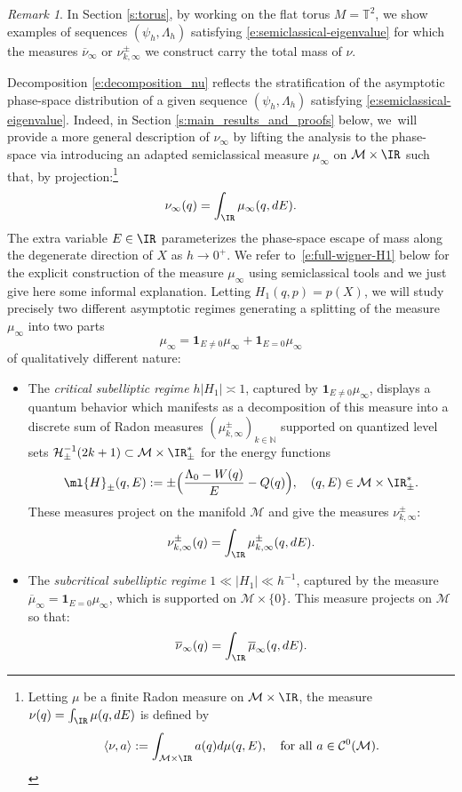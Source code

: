 \documentclass[JEP,XML,SOM,Unicode, NoEqCountersInSection,published]{cedram}
\theoremstyle{plain}
\theoremstyle{definition}
\theoremstyle{remark}
\newtheorem{rema}[theo]{Remark}
\begin{document}
\begin{rema}
In Section \ref{s:torus}, by working on the flat torus $M = \mathbb{T}^2$, we show examples of sequences $(\psi_h,\Lambda_h)$ satisfying \eqref{e:semiclassical-eigenvalue} for which the measures $\overline{\nu}_\infty$ or $\nu_{k,\infty}^\pm$ we construct carry the total mass of $\nu$.
\end{rema}

Decomposition \eqref{e:decomposition_nu} reflects the stratification of the asymptotic phase-space distribution of a given sequence $(\psi_h,\Lambda_h)$ satisfying \eqref{e:semiclassical-eigenvalue}. Indeed, in Section \ref{s:main_results_and_proofs} below, we~will provide a more general description of $\nu_\infty$ by lifting the analysis to the phase-space via introducing an adapted semiclassical measure $\mu_\infty$ on $\mathcal{M} \times \IR$ such that, by projection:\footnote{Letting $\mu$ be a finite Radon measure on $\mathcal{M} \times \IR$, the measure $\nu(q) = \int_\IR \mu(q,dE)$ is defined by
\[
\langle \nu , a \rangle := \int_{\mathcal{M} \times \IR} a(q) d\mu(q,E),\quad\text{for all $a \in \mathcal{C}^0(\mathcal{M})$.}
\]}
\[
\nu_\infty(q) = \int_\IR \mu_\infty(q,dE).
\]
The extra variable $E \in \IR$ parameterizes the phase-space escape of mass along the degenerate direction of $X$ as $h \to 0^+$. We refer to~\eqref{e:full-wigner-H1} below for the explicit construction of the measure $\mu_\infty$ using semiclassical tools and we just give here some informal explanation. Letting $H_1(q,p) = p(X)$, we will study precisely two different asymptotic regimes generating a splitting of the measure $\mu_\infty $ into two parts
\[
\mu_\infty = \mathbf{1}_{E \neq 0} \mu_\infty + \mathbf{1}_{E = 0} \mu_\infty
\]
of qualitatively different nature:
\begin{itemize}
\item The \emph{critical subelliptic regime} $h\vert H_1 \vert \asymp 1$, captured by $\mathbf{1}_{E \neq 0} \mu_\infty$, displays a quantum behavior which manifests as a decomposition of this measure into a discrete sum of Radon measures $(\mu^\pm_{k,\infty})_{k\in \mathbb{N}}$ supported on quantized level sets $\mathcal{H}_\pm^{-1}(2k+1) \subset \mathcal{M} \times \IR^*_\pm$ for the energy functions
\begin{equation}\label{e:preserved-quantity}
\ml{H}_\pm(q,E) := \pm \Bigl(\frac{\Lambda_0-W(q)}{E} - Q(q) \Bigr), \quad (q,E) \in \mathcal{M} \times \IR^*_\pm.
\end{equation}
These measures project on the manifold $\mathcal{M}$ and give the measures $\nu^\pm_{k,\infty}$:
\[
\nu^\pm_{k,\infty}(q) = \int_\IR \mu_{k,\infty}^\pm (q,dE).
\]

\item The \emph{subcritical subelliptic regime} $1 \ll \vert H_1 \vert \ll h^{-1}$, captured by the measure $\overline{\mu}_\infty = \mathbf{1}_{E = 0} \mu_\infty$, which is supported on $\mathcal{M} \times \{0 \}$. This measure projects on $\mathcal{M}$ so that:
\[
\overline{\nu}_\infty(q) = \int_\IR \overline{\mu}_\infty(q,dE).
\]
\end{itemize}
\end{document}
